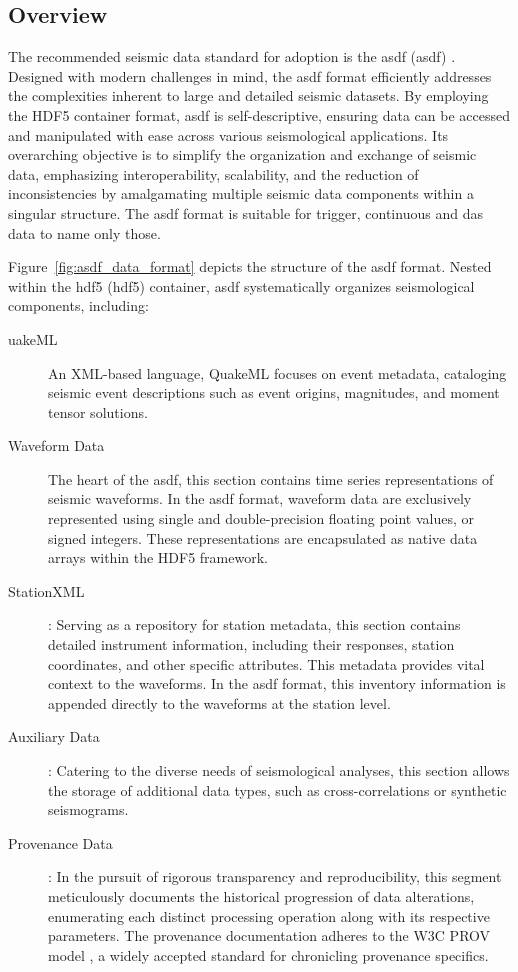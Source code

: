 \subsection{Overview}

The recommended seismic data standard for adoption is the \glsdesc{asdf} (\gls{asdf}) \citep{krischer2016asdf}. Designed with modern challenges in mind, the \gls{asdf} format efficiently addresses the complexities inherent to large and detailed seismic datasets. By employing the HDF5 container format, \gls{asdf} is self-descriptive, ensuring data can be accessed and manipulated with ease across various seismological applications. Its overarching objective is to simplify the organization and exchange of seismic data, emphasizing interoperability, scalability, and the reduction of inconsistencies by amalgamating multiple seismic data components within a singular structure. The \gls{asdf} format is suitable for trigger, continuous and \gls{das} data to name only those.

Figure~\ref{fig:asdf_data_format} depicts the structure of the \gls{asdf} format. Nested within the \glsdesc{hdf5} (\gls{hdf5}) container, \gls{asdf} systematically organizes seismological components, including:

\begin{description}
    \item[uakeML] An XML-based language, QuakeML focuses on event metadata, cataloging seismic event descriptions such as event origins, magnitudes, and moment tensor solutions.
    
    \item[Waveform Data] The heart of the \gls{asdf}, this section contains time series representations of seismic waveforms. In the \gls{asdf} format, waveform data are exclusively represented using single and double-precision floating point values, or signed integers. These representations are encapsulated as native data arrays within the HDF5 framework.

    \item[StationXML]: Serving as a repository for station metadata, this section contains detailed instrument information, including their responses, station coordinates, and other specific attributes. This metadata provides vital context to the waveforms. In the \gls{asdf} format, this inventory information is appended directly to the waveforms at the station level.
    
    \item[Auxiliary Data]: Catering to the diverse needs of seismological analyses, this section allows the storage of additional data types, such as cross-correlations or synthetic seismograms.
    
    \item[Provenance Data]: In the pursuit of rigorous transparency and reproducibility, this segment meticulously documents the historical progression of data alterations, enumerating each distinct processing operation along with its respective parameters. The provenance documentation adheres to the W3C PROV model \citep{w3cprov2013}, a widely accepted standard for chronicling provenance specifics.

\end{description}


